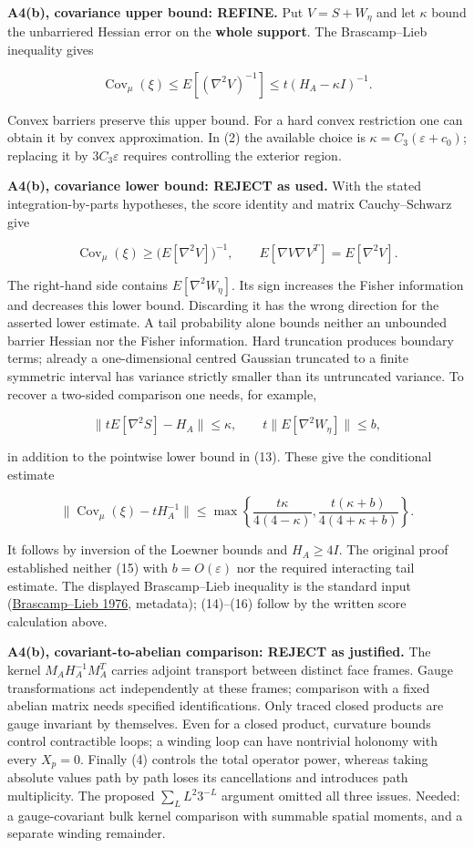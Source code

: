 \documentclass[11pt,a4paper]{article}
\begin{document}
\textbf{A4(b), covariance upper bound: REFINE.} Put \(V=S+W_\eta\) and
let \(\kappa\) bound the unbarriered Hessian error on the \textbf{whole
support}. The Brascamp--Lieb inequality gives

\[\operatorname{Cov}_\mu(\xi)
\le E[(\nabla^2 V)^{-1}]\le t(H_A-\kappa I)^{-1}.\tag{13}\]

Convex barriers preserve this upper bound. For a hard convex restriction
one can obtain it by convex approximation. In (2) the available choice
is \(\kappa=C_3(\varepsilon+c_0)\); replacing it by \(3C_3\varepsilon\)
requires controlling the exterior region.

\textbf{A4(b), covariance lower bound: REJECT as used.} With the stated
integration-by-parts hypotheses, the score identity and matrix
Cauchy--Schwarz give

\[\operatorname{Cov}_\mu(\xi)\ge
\bigl(E[\nabla^2 V]\bigr)^{-1},\qquad
E[\nabla V\nabla V^T]=E[\nabla^2 V].\tag{14}\]

The right-hand side contains \(E[\nabla^2W_\eta]\). Its sign increases
the Fisher information and decreases this lower bound. Discarding it has
the wrong direction for the asserted lower estimate. A tail probability
alone bounds neither an unbounded barrier Hessian nor the Fisher
information. Hard truncation produces boundary terms; already a
one-dimensional centred Gaussian truncated to a finite symmetric
interval has variance strictly smaller than its untruncated variance. To
recover a two-sided comparison one needs, for example,

\[\|tE[\nabla^2S]-H_A\|\le\kappa,\qquad
 t\|E[\nabla^2W_\eta]\|\le b,\tag{15}\]

in addition to the pointwise lower bound in (13). These give the
conditional estimate

\[\|\operatorname{Cov}_\mu(\xi)-tH_A^{-1}\|
\le\max\left\{\frac{t\kappa}{4(4-\kappa)},
\frac{t(\kappa+b)}{4(4+\kappa+b)}\right\}.\tag{16}\]

It follows by inversion of the Loewner bounds and \(H_A\ge4I\). The
original proof established neither (15) with \(b=O(\varepsilon)\) nor
the required interacting tail estimate. The displayed Brascamp--Lieb
inequality is the standard input
(\href{https://doi.org/10.1016/0022-1236(76)90004-5}{Brascamp--Lieb
1976}, metadata); (14)--(16) follow by the written score calculation
above.

\textbf{A4(b), covariant-to-abelian comparison: REJECT as justified.}
The kernel \(M_AH_A^{-1}M_A^T\) carries adjoint transport between
distinct face frames. Gauge transformations act independently at these
frames; comparison with a fixed abelian matrix needs specified
identifications. Only traced closed products are gauge invariant by
themselves. Even for a closed product, curvature bounds control
contractible loops; a winding loop can have nontrivial holonomy with
every \(X_p=0\). Finally (4) controls the total operator power, whereas
taking absolute values path by path loses its cancellations and
introduces path multiplicity. The proposed \(\sum_L L^2 3^{-L}\)
argument omitted all three issues. Needed: a gauge-covariant bulk kernel
comparison with summable spatial moments, and a separate winding
remainder.
\end{document}
